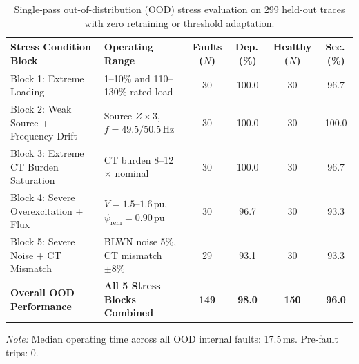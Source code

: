 \begin{table}[H]\centering
\caption{Single-pass out-of-distribution (OOD) stress evaluation on 299 held-out traces with zero retraining or threshold adaptation.}\label{tab:6.4_ood}
\small
\begin{tabular}{@{}llcccc@{}}\toprule
\textbf{Stress Condition Block} & \textbf{Operating Range} & \textbf{Faults ($N$)} & \textbf{Dep.\,(\%)} & \textbf{Healthy ($N$)} & \textbf{Sec.\,(\%)}\\ \midrule
Block 1: Extreme Loading & 1--10\% and 110--130\% rated load & 30 & 100.0 & 30 & 96.7\\
Block 2: Weak Source + Frequency Drift & Source $Z \times 3$, $f = 49.5 / 50.5$\,Hz & 30 & 100.0 & 30 & 100.0\\
Block 3: Extreme CT Burden Saturation & CT burden 8--12$\times$ nominal & 30 & 100.0 & 30 & 96.7\\
Block 4: Severe Overexcitation + Flux & $V = 1.5$--$1.6$\,pu, $\psi_{\text{rem}} = 0.90$\,pu & 30 & 96.7 & 30 & 93.3\\
Block 5: Severe Noise + CT Mismatch & BLWN noise 5\%, CT mismatch $\pm 8\%$ & 29 & 93.1 & 30 & 93.3\\
\midrule
\textbf{Overall OOD Performance} & \textbf{All 5 Stress Blocks Combined} & \textbf{149} & \textbf{98.0} & \textbf{150} & \textbf{96.0}\\
\bottomrule
\end{tabular}
\vspace{3pt}\raggedright\footnotesize\textit{Note:} Median operating time across all OOD internal faults: 17.5\,ms. Pre-fault trips: 0.
\end{table}